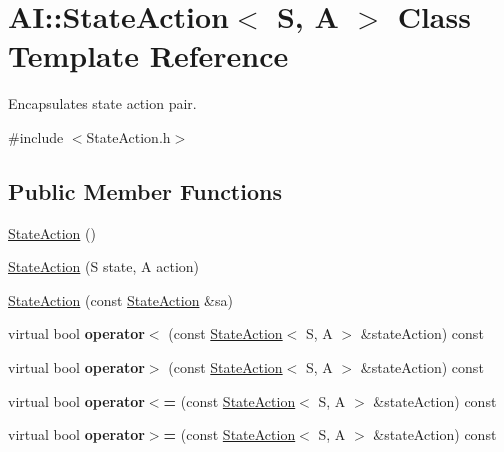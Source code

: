 \hypertarget{classAI_1_1StateAction}{\section{A\+I\+:\+:State\+Action$<$ S, A $>$ Class Template Reference}
\label{classAI_1_1StateAction}
}


Encapsulates state action pair.  




{\ttfamily \#include $<$State\+Action.\+h$>$}

\subsection*{Public Member Functions}
\begin{DoxyCompactItemize}
\item 
\hyperlink{classAI_1_1StateAction_a0afd69cb1b7d577a1b8b51aedffc77bf}{State\+Action} ()
\item 
\hyperlink{classAI_1_1StateAction_ad2a25a219a6941a2e36b0783dd6c01cf}{State\+Action} (S state, A action)
\item 
\hyperlink{classAI_1_1StateAction_a28ad111fb000500eb327c5be9ab2c156}{State\+Action} (const \hyperlink{classAI_1_1StateAction}{State\+Action} \&sa)
\item 
\hypertarget{classAI_1_1StateAction_a8ba71340cc0993a198d9648ab7df8af8}{virtual bool {\bfseries operator$<$} (const \hyperlink{classAI_1_1StateAction}{State\+Action}$<$ S, A $>$ \&state\+Action) const }\label{classAI_1_1StateAction_a8ba71340cc0993a198d9648ab7df8af8}

\item 
\hypertarget{classAI_1_1StateAction_acc9bfdfd11ea817bc8b478bbd0496f96}{virtual bool {\bfseries operator$>$} (const \hyperlink{classAI_1_1StateAction}{State\+Action}$<$ S, A $>$ \&state\+Action) const }\label{classAI_1_1StateAction_acc9bfdfd11ea817bc8b478bbd0496f96}

\item 
\hypertarget{classAI_1_1StateAction_a1cddf0ba056f1be7be3f0a65d2ea7a1b}{virtual bool {\bfseries operator$<$=} (const \hyperlink{classAI_1_1StateAction}{State\+Action}$<$ S, A $>$ \&state\+Action) const }\label{classAI_1_1StateAction_a1cddf0ba056f1be7be3f0a65d2ea7a1b}

\item 
\hypertarget{classAI_1_1StateAction_a86027cd4244a8913e2b109aabe3191d4}{virtual bool {\bfseries operator$>$=} (const \hyperlink{classAI_1_1StateAction}{State\+Action}$<$ S, A $>$ \&state\+Action) const }\label{classAI_1_1StateAction_a86027cd4244a8913e2b109aabe3191d4}


\end{DoxyCompactItemize}
